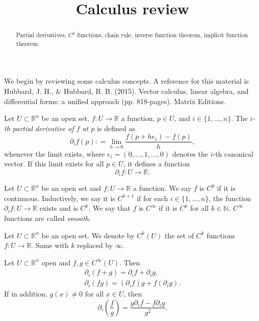 \documentclass{ximera}
\title{Calculus review}
\begin{document}
    
    \begin{abstract} Partial derivatives, $C^k$ functions, chain rule, inverse function theorem, implicit function theorem.
    \end{abstract}
    \maketitle



We begin by reviewing some calculus concepts.  A reference for this material is Hubbard, J. H., \& Hubbard, B. B. (2015). Vector calculus, linear algebra, and differential forms: a unified approach (pp. 818-pages). Matrix Editions. 



\begin{definition}
    Let $U \subset \mathbb{R}^n$ be an open set,  $f : U \to \mathbb{R}$ a function, $p \in U$, and $i \in \{ 1, \ldots, n \}$. The \emph{$i$-th partial derivative of $f$ at $p$} is defined as
    \[      \partial_i f (p) : = \lim_{h \to 0} \frac{f(p + h e_i) - f(p)}{h} ,             \]
    whenever the limit exists, where $e_i = (0, \ldots, 1, \ldots , 0)$ denotes the $i$-th canonical vector. If this limit exists for all $p \in U$, it defines a function 
    \[ \partial_i f  : U \to \mathbb{R}. \] 
\end{definition}

\begin{definition}[$C^k$ functions]\label{def:c-k}
    Let $U \subset \mathbb{R}^n$ be an open set and  $f : U \to \mathbb{R}$ a function. We say $f$ is $C^0$ if it is continuous. Inductively, we say it is $C^{k+1} $ if for each $i \in \{ 1, \ldots , n \}$, the function $ \partial_i  f  : U \to \mathbb{R}$ exists and is $C^k$.   We say that $f$ is $C^{\infty}$ if it is $C^k$ for all $k \in \mathbb{N}$.  $C^{\infty}$ functions are called \emph{smooth}.
\end{definition}

\begin{notation}
    Let $U \subset \mathbb{R}^n$ be an open set. We denote by $C^k (U)$ the set of $C^k$ functions   $f: U \to \mathbb{R}$. Same with $k $ replaced by $\infty$. 
\end{notation}


\begin{proposition}\label{pro:classic-derivative-rules}
    Let $U \subset \mathbb{R}^n$ open and $f,g \in C^{\infty}(U)$. Then
    \begin{gather*}
            \partial_i (f+ g)  = \partial _i f + \partial _i g ,\\
            \partial _i (fg)  = (\partial _i f) g + f (\partial _i g) . 
    \end{gather*}
    If in addition, $g (x) \neq 0$ for all $x \in U$, then
    \[    \partial _i \left( \frac{f}{g} \right) = \frac{g \partial _i f - f \partial _i g}{g^2}     .          \]
\end{proposition}
\end{document}
